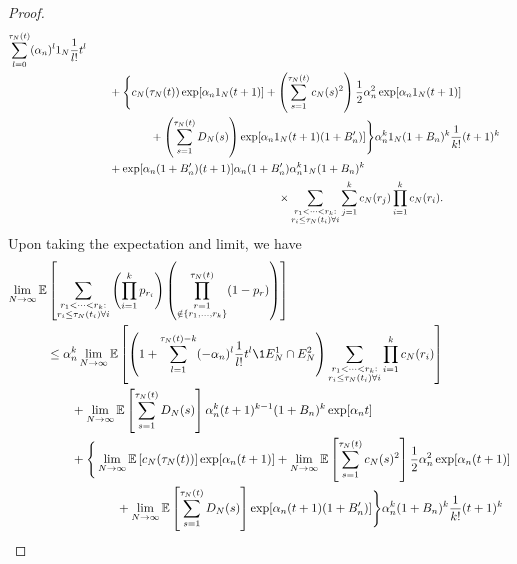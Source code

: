 \begin{proof}
\begin{align*}
        \sum_{l=0}^{\tau_N(t)} (\alpha_n)^l \ON \frac{1}{l!} t^l \\
    &\qquad+ \Bigg\{ c_N(\tau_N(t)) 
        \exp[ \alpha_n \ON (t+1) ]
        + \left( \sum_{s=1}^{\tau_N(t)} c_N(s)^2 \right)
        \frac{1}{2} \alpha_n^2 \exp[ \alpha_n \ON (t+1) ] \\
    &\hspace{2cm}+ \left( \sum_{s=1}^{\tau_N(t)} D_N(s) \right)
        \exp[ \alpha_n \ON (t+1) (1+B_n^\prime) ] \Bigg\}
        \alpha_n^k \ON (1 + B_n)^k \frac{1}{k!} (t+1)^k \\
    &\qquad+ \exp[ \alpha_n (1 + B_n^\prime) (t+1) ]
        \alpha_n (1 + B_n^\prime)
        \alpha_n^k \ON (1 + B_n)^k \\
    &\hspace{6cm}\times \sum_{\substack{r_1 <\dots< r_k 
        :\\ r_i \leq \tau_N(t_i) \forall i}}
        \sum_{j=1}^k c_N(r_j)
        \prod_{i=1}^k c_N(r_i).
\end{align*}
Upon taking the expectation and limit, we have
\begin{align}
\lim_{N\to\infty} \E &\left[ 
        \sum_{\substack{r_1 <\dots< r_k :\\ r_i \leq \tau_N(t_i) \forall i}}
        \left( \prod_{i=1}^k p_{r_i} \right)
        \left( \prod_{\substack{r=1 \\ \notin \{r_1,\dots,r_k\} }}^{\tau_N(t)} 
        (1-p_r) \right) \right] \notag\\
&\leq \alpha_n^k \lim_{N\to\infty} \E\left[ \left( 1+
        \sum_{l=1}^{\tau_N(t) -k} (-\alpha_n)^l \frac{1}{l!} t^l 
        \1{E_N^1 \cap E_N^2} \right)
        \sum_{\substack{r_1 <\dots< r_k :\\ r_i \leq \tau_N(t_i) \forall i}}
        \prod_{i=1}^k c_N(r_i) \right] \notag\\
    &\qquad+  \lim_{N\to\infty} \E\left[ \sum_{s=1}^{\tau_N(t)} D_N(s) \right]
        \alpha_n^k (t+1)^{k-1} (1+B_n)^k
        \exp[ \alpha_n t ] \notag\\
    &\qquad+ \Bigg\{  \lim_{N\to\infty} \E\left[ c_N(\tau_N(t)) \right]
        \exp[ \alpha_n (t+1) ]
        +  \lim_{N\to\infty} \E\left[ \sum_{s=1}^{\tau_N(t)} c_N(s)^2 \right]
        \frac{1}{2} \alpha_n^2 \exp[ \alpha_n (t+1) ] \notag\\
    &\hspace{2cm}+  \lim_{N\to\infty} 
        \E\left[ \sum_{s=1}^{\tau_N(t)} D_N(s) \right]
        \exp[ \alpha_n (t+1) (1+B_n^\prime) ] \Bigg\}
        \alpha_n^k (1 + B_n)^k \frac{1}{k!} (t+1)^k \notag\\

\end{align}
\end{proof}

